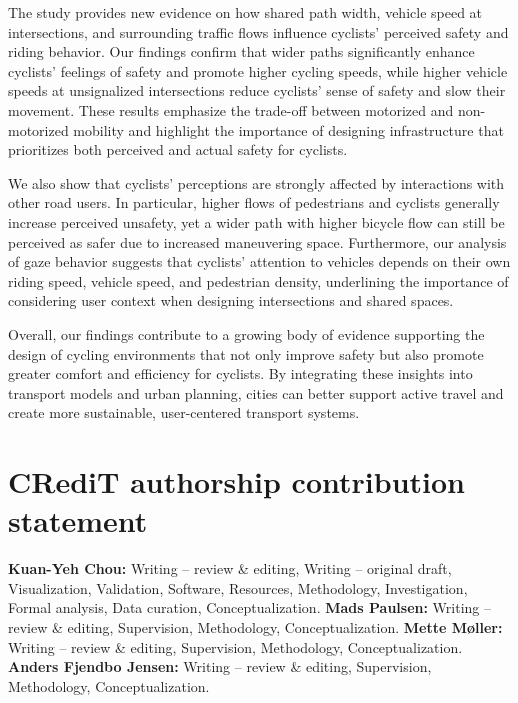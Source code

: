 \documentclass[3p,authoryear]{elsarticle}
\begin{document}
The study provides new evidence on how shared path width, vehicle speed at
intersections, and surrounding traffic flows influence cyclists' perceived safety
and riding behavior. Our findings confirm that wider paths significantly enhance
cyclists' feelings of safety and promote higher cycling speeds, while higher
vehicle speeds at unsignalized intersections reduce cyclists' sense of safety and
slow their movement. These results emphasize the trade-off between motorized and
non-motorized mobility and highlight the importance of designing infrastructure
that prioritizes both perceived and actual safety for cyclists.

We also show that cyclists' perceptions are strongly affected by interactions
with other road users. In particular, higher flows of pedestrians and cyclists
generally increase perceived unsafety, yet a wider path with higher bicycle flow
can still be perceived as safer due to increased maneuvering space. Furthermore,
our analysis of gaze behavior suggests that cyclists' attention to vehicles
depends on their own riding speed, vehicle speed, and pedestrian density,
underlining the importance of considering user context when designing
intersections and shared spaces.

Overall, our findings contribute to a growing body of evidence supporting the
design of cycling environments that not only improve safety but also promote
greater comfort and efficiency for cyclists. By integrating these insights into
transport models and urban planning, cities can better support active travel and
create more sustainable, user-centered transport systems.

\section*{CRediT authorship contribution statement}
\textbf{Kuan-Yeh Chou:} Writing -- review \& editing, Writing -- original draft,
Visualization, Validation, Software, Resources, Methodology, Investigation,
Formal analysis, Data curation, Conceptualization. \textbf{Mads Paulsen:}
Writing -- review \& editing, Supervision, Methodology, Conceptualization.
\textbf{Mette Møller:} Writing -- review \& editing, Supervision, Methodology,
Conceptualization. \textbf{Anders Fjendbo Jensen:} Writing -- review \& editing,
Supervision, Methodology, Conceptualization.

\end{document}
